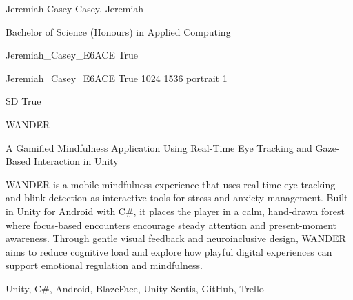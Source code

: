
\begingroup{}\relax



\def\Key{Jeremiah_Casey_E6ACE}

{Jeremiah Casey}
{Casey, Jeremiah}

{Bachelor of Science (Honours) in Applied Computing}

{Jeremiah_Casey_E6ACE}
{True}

{Jeremiah_Casey_E6ACE}
{True}
{1024}
{1536}
{portrait}
{1}

{SD}
{True}

{WANDER}

{A Gamified Mindfulness Application Using Real-Time Eye Tracking and Gaze-Based Interaction in Unity}

{WANDER is a mobile mindfulness experience that uses real-time eye tracking and blink detection as interactive tools for stress and anxiety management. Built in Unity for Android with C\#, it places the player in a calm, hand-drawn forest where focus-based encounters encourage steady attention and present-moment awareness. Through gentle visual feedback and neuroinclusive design, WANDER aims to reduce cognitive load and explore how playful digital experiences can support emotional regulation and mindfulness.}

{Unity, C\#, Android, BlazeFace, Unity Sentis, GitHub, Trello}


